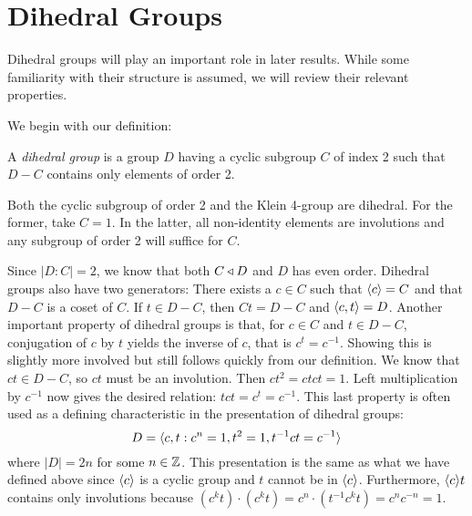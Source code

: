 \documentclass[main.tex]{subfiles}
\begin{document}
\section{Dihedral Groups}

Dihedral groups will play an important role in later results. While some familiarity with their structure is assumed, we will review their relevant properties.

\hss

We begin with our definition:

\begin{definition}
A \emph{dihedral group} is a group $D$ having a cyclic subgroup $C$ of index 2 such that $D - C$ contains only elements of order 2.
\end{definition}

\begin{remark}
Both the cyclic subgroup of order 2 and the Klein 4-group are dihedral. For the former, take $C = 1$. In the latter, all non-identity elements are involutions and any subgroup of order 2 will suffice for $C$.
\end{remark}

\hss

Since $|D : C| = 2$, we know that both $C \triangleleft D$ and $D$ has even order. Dihedral groups also have two generators: There exists a $c \in C$ such that $\langle c \rangle = C$ and that $D - C$ is a coset of $C$. If $t \in D - C$, then $Ct = D - C$ and $\langle c,t \rangle = D$. Another important property of dihedral groups is that, for $c \in C$ and $t \in D - C$, conjugation of $c$ by $t$ yields the inverse of $c$, that is $c^t = c^{-1}$. Showing this is slightly more involved but still follows quickly from our definition. We know that $ct \in D - C$, so $ct$ must be an involution. Then $ct^2 = ctct = 1$. Left multiplication by $c^{-1}$ now gives the desired relation: $tct = c^t = c^{-1}$. This last property is often used as a defining characteristic in the presentation of dihedral groups: 
$$D = \langle c, t : c^n = 1, t^2 = 1, t^{-1}ct = c^{-1} \rangle$$
where $|D| = 2n$ for some $n \in \mathbb{Z}$. This presentation is the same as what we have defined above since $\langle c \rangle$ is a cyclic group and $t$ cannot be in $\langle c \rangle$. Furthermore, $\langle c \rangle t$ contains only involutions because $(c^k t) \cdot (c^k t) = c^n \cdot (t^{-1} c^k t) = c^n c^{-n} = 1$.
\end{document}
